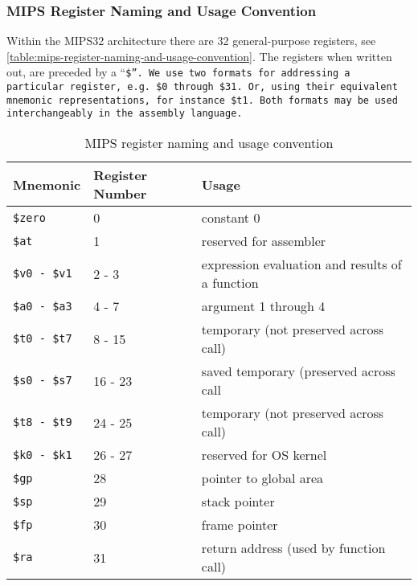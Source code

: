 \subsubsection{MIPS Register Naming and Usage Convention}

Within the MIPS32 architecture there are 32 general-purpose registers,
see \autoref{table:mips-register-naming-and-usage-convention}. The
registers when written out, are preceded by a ``\tt{\$}''.  We use
two formats for addressing a particular register, e.g. \tt{\$0}
through \tt{\$31}. Or, using their equivalent mnemonic
representations, for instance \tt{\$t1}. Both formats may be used
interchangeably in the assembly language.

\begin{table}[H]
\centering
\begin{tabular}{lll}
\toprule
Mnemonic & Register Number & Usage                                                     \\
\midrule
\tt{\$zero}                & 0       & constant 0                                      \\
\tt{\$at}                  & 1       & reserved for assembler                          \\
\tt{\$v0} - \tt{\$v1}      & 2 - 3   & expression evaluation and results of a function \\
\tt{\$a0} - \tt{\$a3}      & 4 - 7   & argument 1 through 4                            \\
\tt{\$t0} - \tt{\$t7}      & 8 - 15  & temporary (not preserved across call)           \\
\tt{\$s0} - \tt{\$s7}      & 16 - 23 & saved temporary (preserved across call          \\
\tt{\$t8} - \tt{\$t9}      & 24 - 25 & temporary (not preserved across call)           \\
\tt{\$k0} - \tt{\$k1}      & 26 - 27 & reserved for OS kernel                          \\
\tt{\$gp}                  & 28      & pointer to global area                          \\
\tt{\$sp}                  & 29      & stack pointer                                   \\
\tt{\$fp}                  & 30      & frame pointer                                   \\
\tt{\$ra}                  & 31      & return address (used by function call)          \\
\bottomrule
\end{tabular}
\caption{MIPS register naming and usage convention}
\label{table:mips-register-naming-and-usage-convention}
\end{table}
